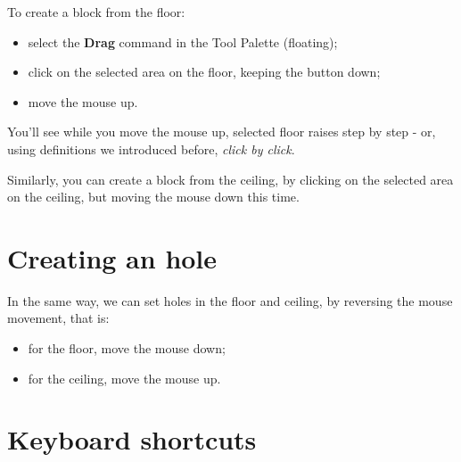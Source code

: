To create a block from the floor:
\begin{itemize}
    \item select the \textbf{Drag} command in the Tool Palette (floating);
    \item {} click on the selected area on the floor, keeping the button down;
    \item move the mouse up.
\end{itemize}

You'll see while you move the mouse up, selected floor raises step by step - or, using definitions we introduced before, \emph{click by click}.

\par Similarly, you can create a block from the ceiling, by clicking on the selected area on the ceiling, but moving the mouse down this time.

\section{Creating an hole}

In the same way, we can set holes in the floor and ceiling, by reversing the mouse movement, that is:
\begin{itemize}
    \item for the floor, move the mouse down;
    \item for the ceiling, move the mouse up.
\end{itemize}

\section{Keyboard shortcuts}
